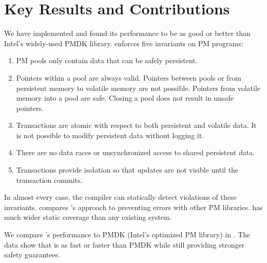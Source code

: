 \documentclass[pageno]{jpaper}
\theoremstyle{invar}
\theoremstyle{goal}
\begin{document}
\section{Key Results and Contributions}
\label{sec:key-contributions}

We have implemented \this{} and found its
performance to be as good or better than Intel's widely-used PMDK library.
\This{} enforces five invariants on PM programs:

\begin{enumerate}

\item PM pools only contain data that can be safely persistent.
\item Pointers within a pool are always valid.  Pointers between pools or from
  persistent memory to volatile memory are not possible.  Pointers from
  volatile memory into a pool are safe.  Closing a pool does not result in
  unsafe pointers.
\item  Transactions are atomic with respect to both persistent and volatile data.
  It is not possible to modify persistent data without logging
  it.
\item There are no data races or unsynchronized access to shared persistent data. 
\item Transactions provide isolation so that updates are not visible until the transaction commits. 
\end{enumerate}

\noindent
In almost every case, the compiler can statically detect violations of these
invariants.   compares \this{}'s approach to preventing errors
with other PM libraries.  \This{} has much wider static coverage than any
existing system.

We compare \this{}'s performance to PMDK (Intel's optimized PM library) in
.  The data show that \this{} is as fast or faster than PMDK
while still providing stronger safety guarantees.  
\end{document}
